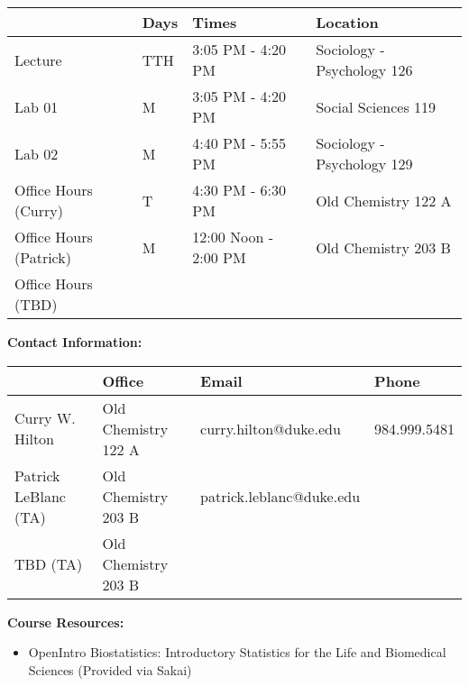 \documentclass[11pt, a4paper]{article}
\begin{document}
\begin{table}[h]
\centering
\begin{tabular}{l|l|l|l}
\toprule
                                & \textbf{Days}      & \textbf{Times} & \textbf{Location} \\ \midrule
Lecture                & TTH                   & 3:05 PM - 4:20 PM                   & Sociology - Psychology 126             \\ 
Lab 01                 & M                     & 3:05 PM - 4:20 PM                   & Social Sciences 119                    \\ 
Lab 02                 & M                     & 4:40 PM - 5:55 PM                   & Sociology - Psychology 129             \\ 
Office Hours (Curry)   & T                     & 4:30 PM - 6:30 PM                   & Old Chemistry 122 A                    \\ 
Office Hours (Patrick) & M &      12:00 Noon - 2:00 PM                               &     Old Chemistry 203 B                                  \\ 
Office Hours (TBD)  &  &                                     &                                        \\ \bottomrule
\end{tabular}
\end{table}


\noindent\textbf{Contact Information:}

\begin{table}[h]
\centering
\begin{tabular}{l|l|l|l}
\toprule
                         & \textbf{Office}& \textbf{Email} & \textbf{Phone} \\  \midrule
Curry W. Hilton & Old Chemistry 122 A                  & curry.hilton@duke.edu               & 984.999.5481                        \\ 
Patrick LeBlanc  (TA) & Old Chemistry 203 B             & patrick.leblanc@duke.edu            &                                     \\
TBD (TA) & Old Chemistry 203 B    & &                         \\ \bottomrule
\end{tabular}
\end{table}


\noindent\textbf{Course Resources:}

\begin{itemize}

\item OpenIntro Biostatistics: Introductory Statistics for the Life and Biomedical Sciences (Provided via Sakai)

\end{itemize}
\end{document}
